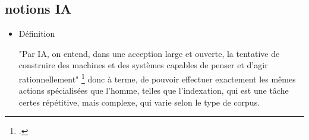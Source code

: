 \subsection{notions IA}

\begin{itemize}
	\item Définition
	
	"Par IA, on entend, dans une acception large et ouverte, la tentative de construire des
	machines et des systèmes capables de penser et d'agir rationnellement"
	\footcite{zotero-item-584}
	donc à terme, de pouvoir effectuer exactement les mêmes actions spécialisées que l'homme, telles que l'indexation, qui est une tâche certes répétitive, mais complexe, qui varie selon le type de corpus. 
	
	
	
	

	
	
	


	
\end{itemize}